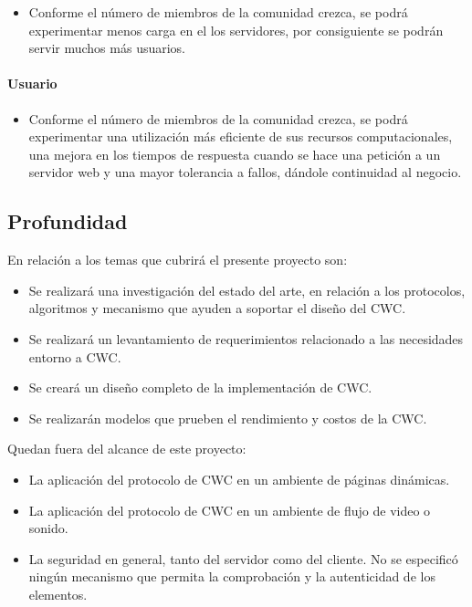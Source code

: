 \begin{itemize}
\item Conforme el número de miembros de la comunidad crezca, se podrá experimentar menos carga en el los servidores, por consiguiente se podrán servir muchos más usuarios.
\end{itemize}
 

\paragraph{Usuario}
\begin{itemize}
\item Conforme el número de miembros de la comunidad crezca, se podrá experimentar una utilización más eficiente de sus recursos computacionales, una mejora en los tiempos de respuesta cuando se hace una petición a un servidor web y una mayor tolerancia a fallos, dándole continuidad al negocio. 
\end{itemize}

\subsection{Profundidad}
En relación a los temas que cubrirá el presente proyecto son:
\begin{itemize}
\item Se realizará una investigación del estado del arte, en relación a los protocolos, algoritmos y mecanismo que ayuden a soportar el diseño del CWC.
\item Se realizará un levantamiento de requerimientos relacionado a las necesidades entorno a CWC.
\item Se creará un diseño completo de la implementación de CWC.
\item Se realizarán modelos que prueben el rendimiento y costos de la CWC.
\end{itemize}

Quedan fuera del alcance de este proyecto:

\begin{itemize}
\item La aplicación del protocolo de CWC en un ambiente de páginas dinámicas.
\item La aplicación del protocolo de CWC en un ambiente de flujo de video o sonido.
\item La seguridad en general, tanto del servidor como del cliente. No se especificó ningún mecanismo que permita la comprobación y la autenticidad de los elementos.
\end{itemize}

